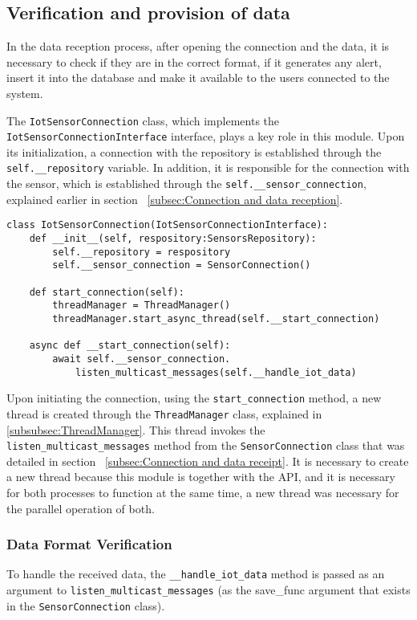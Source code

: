 \subsection[Verification and provision of data]{Verification and provision of data}\label{subsec:checkDataReceived}
In the data reception process, after opening the connection and the data, it is necessary to check if they are in the correct format, if it generates any alert, insert it into the database and make it available to the users connected to the system.

The \texttt{IotSensorConnection} class, which implements the \texttt{IotSensorConnectionInterface} interface, plays a key role in this module. Upon its initialization, a connection with the repository is established through the \texttt{self.\_\_repository} variable. In addition, it is responsible for the connection with the sensor, which is established through the \texttt{self.\_\_sensor\_connection}, explained earlier in section ~\ref{subsec:Connection and data reception}.

\begin{verbatim}
class IotSensorConnection(IotSensorConnectionInterface):
    def __init__(self, respository:SensorsRepository):
        self.__repository = respository
        self.__sensor_connection = SensorConnection()
    
    def start_connection(self):
        threadManager = ThreadManager()
        threadManager.start_async_thread(self.__start_connection)
    
    async def __start_connection(self):
        await self.__sensor_connection.
            listen_multicast_messages(self.__handle_iot_data)
\end{verbatim}

Upon initiating the connection, using the \texttt{start\_connection} method, a new thread is created through the \texttt{ThreadManager} class, explained in \ref{subsubsec:ThreadManager}. This thread invokes the \texttt{listen\_multicast\_messages} method from the \texttt{SensorConnection} class that was detailed in section ~\ref{subsec:Connection and data receipt}. It is necessary to create a new thread because this module is together with the \gls{API}, and it is necessary for both processes to function at the same time, a new thread was necessary for the parallel operation of both.

\subsubsection{Data Format Verification}
To handle the received data, the \texttt{\_\_handle\_iot\_data} method is passed as an argument to \texttt{listen\_multicast\_messages} (as the save\_func argument that exists in the \texttt{SensorConnection} class).

